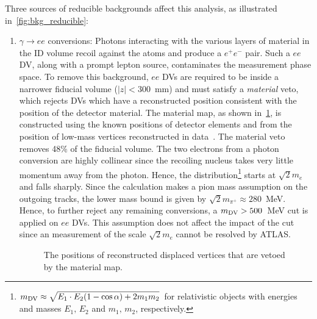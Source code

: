 Three sources of reducible backgrounds affect this analysis, as illustrated in~\cref{fig:bkg_reducible}:
\begin{enumerate}
    \item $\gamma\to ee$ conversions: Photons interacting with the various layers of material in the ID volume recoil against the atoms and produce a $e^+e^-$ pair. Such a $ee$ DV, along with a prompt lepton source, contaminates the measurement phase space. To remove this background, $ee$ DVs are required to be inside a narrower fiducial volume ($|z|<300$~mm) and must satisfy a \textit{material} veto, which rejects DVs which have a reconstructed position consistent with the position of the detector material. The material map, as shown in~\cref{fig:material_map}, is constructed using the known positions of detector elements and from the position of low-mass vertices reconstructed in data~\cite{SUSY-2018-13}. The material veto removes 48\% of the fiducial volume. The two electrons from a photon conversion are highly collinear since the recoiling nucleus takes very little momentum away from the photon. Hence, the \mdv distribution\footnote{$m_{\mathrm{DV}}\approx\sqrt{E_1\cdot E_2 (1-\cos\alpha)+2m_1m_2}$ for relativistic objects with energies and masses $E_1,\,E_2$ and $m_1,\,m_2$, respectively.} starts at $\sqrt{2}m_e$ and falls sharply. Since the \mdv calculation makes a pion mass assumption on the outgoing tracks, the lower mass bound is given by $\sqrt{2}m_{\pi^+}\approx280$~MeV. Hence, to further reject any remaining conversions, a $m_{\mathrm{DV}}>500$~MeV cut is applied on $ee$ DVs. This assumption does not affect the impact of the cut since an \mdv measurement of the scale $\sqrt{2}m_e$ cannot be resolved by ATLAS.

    \begin{figure}[!ht]
        \centering
        \caption{The positions of reconstructed displaced vertices that are vetoed by the material map.~\cite{SUSY-2018-13}}
        \label{fig:material_map}
    \end{figure}


\end{enumerate}
